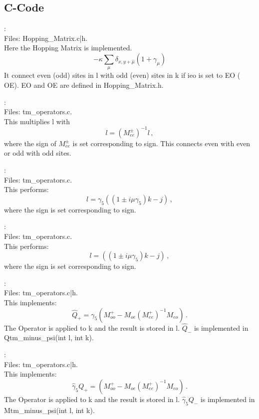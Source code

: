 \subsection{C-Code}

:\\
Files: {\ttfamily Hopping\_Matrix.c|h}.\\
Here the Hopping Matrix is implemented.
\[
-\kappa\sum_\mu \delta_{x,y+\hat\mu}(1+\gamma_\mu)
\]
It connect even (odd) sites in {\ttfamily l} with odd  (even) sites in {\ttfamily k}
if {\ttfamily ieo} is set to {\ttfamily EO} ({\ttfamily
  OE}). {\ttfamily EO} and {\ttfamily OE} are defined in {\ttfamily
  Hopping\_Matrix.h}.

:\\
Files: {\ttfamily tm\_operators.c}.\\
This multiplies {\ttfamily l} with 
\[
l = (M_{ee}^{\pm})^{-1} l\, ,
\]
where the sign of $M_{ee}^{\pm}$ is set corresponding to {\ttfamily
  sign}. This connects even with even or odd with odd sites.

:\\
Files: {\ttfamily tm\_operators.c}.\\
This performs:
\[
l = \gamma_5 ((1 \pm i \mu \gamma_5)k - j)\, ,
\]
where the sign is set corresponding to {\ttfamily sign}.

:\\
Files: {\ttfamily tm\_operators.c}.\\
This performs:
\[
l = ((1 \pm i \mu \gamma_5)k - j)\, ,
\]
where the sign is set corresponding to {\ttfamily sign}.

:\\
Files: {\ttfamily tm\_operators.c|h}.\\
This implements:
\[
\hat Q_{+} = \gamma_5(M_{oo}^+ - M_{oe}(M_{ee}^+ )^{-1}M_{eo})\, .
\]
The Operator is applied to {\ttfamily k} and the result is stored in
{\ttfamily l}. $\hat Q_{-}$ is implemented in {\ttfamily
  Qtm\_minus\_psi(int l, int k)}.

:\\
Files: {\ttfamily tm\_operators.c|h}.\\
This implements:
\[
\hat \gamma_5Q_{+} = (M_{oo}^+ - M_{oe}(M_{ee}^+ )^{-1}M_{eo})\, .
\]
The Operator is applied to {\ttfamily k} and the result is stored in
{\ttfamily l}. $\hat \gamma_5Q_{-}$ is implemented in {\ttfamily
  Mtm\_minus\_psi(int l, int k)}.

